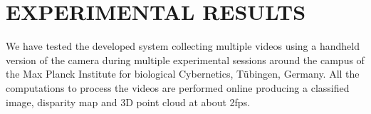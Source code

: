\documentclass[letterpaper, 10pt, conference]{ieeeconf}      %
\begin{document}
\section{EXPERIMENTAL RESULTS}\label{sec:experimental_setup}






We have tested the developed system collecting multiple videos using a handheld version of the camera during multiple experimental sessions around the campus of the Max Planck Institute for biological Cybernetics, T{\"u}bingen, Germany.
All the computations to process the videos are performed online producing a classified image, disparity map and 3D point cloud at about 2fps.








\end{document}
